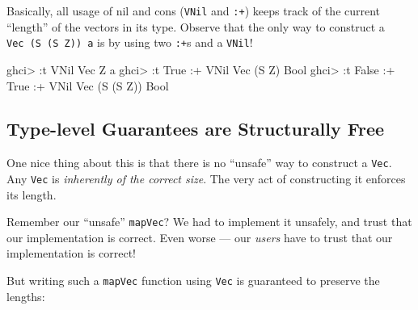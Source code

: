 \documentclass[]{article}
\newenvironment{Shaded}{}{}
\newcommand{\DataTypeTok}[1]{\textcolor[rgb]{0.56,0.13,0.00}{#1}}
\newcommand{\NormalTok}[1]{#1}
\newcommand{\OperatorTok}[1]{\textcolor[rgb]{0.40,0.40,0.40}{#1}}
\begin{document}
Basically, all usage of nil and cons (\texttt{VNil} and \texttt{:+}) keeps track
of the current ``length'' of the vectors in its type. Observe that the only way
to construct a
\texttt{Vec\ (\textquotesingle{}S\ (\textquotesingle{}S\ \textquotesingle{}Z))\ a}
is by using two \texttt{:+}s and a \texttt{VNil}!

\begin{Shaded}
\begin{Highlighting}[]
\NormalTok{ghci}\OperatorTok{>} \OperatorTok{:}\NormalTok{t }\DataTypeTok{VNil}
\DataTypeTok{Vec} \DataTypeTok{\textquotesingle{}Z}\NormalTok{ a}
\NormalTok{ghci}\OperatorTok{>} \OperatorTok{:}\NormalTok{t }\DataTypeTok{True} \OperatorTok{:+} \DataTypeTok{VNil}
\DataTypeTok{Vec}\NormalTok{ (}\DataTypeTok{\textquotesingle{}S} \DataTypeTok{\textquotesingle{}Z}\NormalTok{) }\DataTypeTok{Bool}
\NormalTok{ghci}\OperatorTok{>} \OperatorTok{:}\NormalTok{t }\DataTypeTok{False} \OperatorTok{:+} \DataTypeTok{True} \OperatorTok{:+} \DataTypeTok{VNil}
\DataTypeTok{Vec}\NormalTok{ (}\DataTypeTok{\textquotesingle{}S}\NormalTok{ (}\DataTypeTok{\textquotesingle{}S} \DataTypeTok{\textquotesingle{}Z}\NormalTok{)) }\DataTypeTok{Bool}
\end{Highlighting}
\end{Shaded}

\hypertarget{type-level-guarantees-are-structurally-free}{%
\subsection{Type-level Guarantees are Structurally
Free}\label{type-level-guarantees-are-structurally-free}}

One nice thing about this is that there is no ``unsafe'' way to construct a
\texttt{Vec}. Any \texttt{Vec} is \emph{inherently of the correct size}. The
very act of constructing it enforces its length.

Remember our ``unsafe'' \texttt{mapVec}? We had to implement it unsafely, and
trust that our implementation is correct. Even worse --- our \emph{users} have
to trust that our implementation is correct!

But writing such a \texttt{mapVec} function using \texttt{Vec} is guaranteed to
preserve the lengths:
\end{document}
